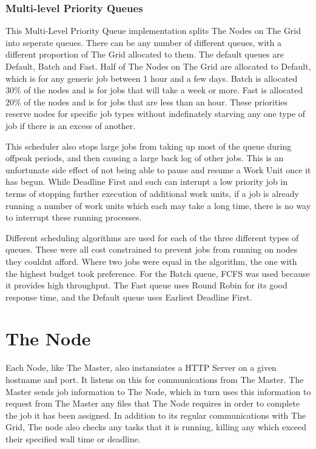 \subsubsection{Multi-level Priority Queues}
This Multi-Level Priority Queue implementation splits The Nodes on The Grid into seperate queues. There can be any number of different queues, with a different proportion of The Grid allocated to them. The default queues are Default, Batch and Fast. Half of The Nodes on The Grid are allocated to Default, which is for any generic job between 1 hour and a few days. Batch is allocated 30\% of the nodes and is for jobs that will take a week or more. Fast is allocated 20\% of the nodes and is for jobs that are less than an hour. These priorities reserve nodes for specific job types without indefinately starving any one type of job if there is an excess of another.

This scheduler also stops large jobs from taking up most of the queue during offpeak periods, and then causing a large back log of other jobs. This is an unfortunate side effect of not being able to pause and resume a Work Unit once it has begun. While Deadline First and such can interupt a low priority job in terms of stopping further execution of additional work units, if a job is already running a number of work units which each may take a long time, there is no way to interrupt these running processes.

Different scheduling algorithms are used for each of the three different types of queues. These were all cost constrained to prevent jobs from running on nodes they couldnt afford. Where two jobs were equal in the algorithm, the one with the highest budget took preference. For the Batch queue, FCFS was used because it provides high throughput. The Fast queue uses Round Robin for its good response time, and the Default queue uses Earliest Deadline First.

\section{The Node}
Each Node, like The Master, also instansiates a HTTP Server on a given hostname and port. It listens on this for communications from The Master. The Master sends job information to The Node, which in turn uses this information to request from The Master any files that The Node requires in order to complete the job it has been assigned. In addition to its regular communications with The Grid, The node also checks any tasks that it is running, killing any which exceed their specified wall time or deadline.
